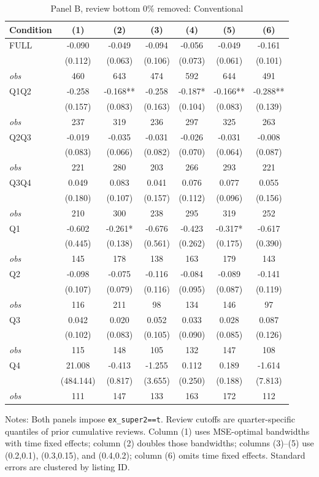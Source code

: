\begin{table}[!htbp]
\centering
\caption{Panel B, review bottom 0\% removed: Conventional}
\begin{tabular}{lcccccc}
\toprule
Condition & (1) & (2) & (3) & (4) & (5) & (6) \\
\midrule
FULL & -0.090 & -0.049 & -0.094 & -0.056 & -0.049 & -0.161 \\
 & (0.112) & (0.063) & (0.106) & (0.073) & (0.061) & (0.101) \\
\textit{obs} & 460 & 643 & 474 & 592 & 644 & 491 \\
Q1Q2 & -0.258 & -0.168** & -0.258 & -0.187* & -0.166** & -0.288** \\
 & (0.157) & (0.083) & (0.163) & (0.104) & (0.083) & (0.139) \\
\textit{obs} & 237 & 319 & 236 & 297 & 325 & 263 \\
Q2Q3 & -0.019 & -0.035 & -0.031 & -0.026 & -0.031 & -0.008 \\
 & (0.083) & (0.066) & (0.082) & (0.070) & (0.064) & (0.087) \\
\textit{obs} & 221 & 280 & 203 & 266 & 293 & 221 \\
Q3Q4 & 0.049 & 0.083 & 0.041 & 0.076 & 0.077 & 0.055 \\
 & (0.180) & (0.107) & (0.157) & (0.112) & (0.096) & (0.156) \\
\textit{obs} & 210 & 300 & 238 & 295 & 319 & 252 \\
Q1 & -0.602 & -0.261* & -0.676 & -0.423 & -0.317* & -0.617 \\
 & (0.445) & (0.138) & (0.561) & (0.262) & (0.175) & (0.390) \\
\textit{obs} & 145 & 178 & 138 & 163 & 179 & 143 \\
Q2 & -0.098 & -0.075 & -0.116 & -0.084 & -0.089 & -0.141 \\
 & (0.107) & (0.079) & (0.116) & (0.095) & (0.087) & (0.119) \\
\textit{obs} & 116 & 211 & 98 & 134 & 146 & 97 \\
Q3 & 0.042 & 0.020 & 0.052 & 0.033 & 0.028 & 0.087 \\
 & (0.102) & (0.083) & (0.105) & (0.090) & (0.085) & (0.126) \\
\textit{obs} & 115 & 148 & 105 & 132 & 147 & 108 \\
Q4 & 21.008 & -0.413 & -1.255 & 0.112 & 0.189 & -1.614 \\
 & (484.144) & (0.817) & (3.655) & (0.250) & (0.188) & (7.813) \\
\textit{obs} & 111 & 147 & 133 & 163 & 172 & 112 \\
\bottomrule
\end{tabular}
\begin{minipage}{0.98\textwidth}\footnotesize
Notes: Both panels impose \texttt{ex\_super2==t}. Review cutoffs are quarter-specific quantiles of prior cumulative reviews. Column (1) uses MSE-optimal bandwidths with time fixed effects; column (2) doubles those bandwidths; columns (3)--(5) use (0.2,0.1), (0.3,0.15), and (0.4,0.2); column (6) omits time fixed effects. Standard errors are clustered by listing ID.
\end{minipage}
\end{table}

